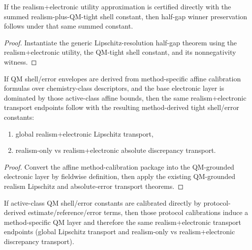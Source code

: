 \begin{theorem}\label{thm:qm-grounded-electronic-halfgap-transport}
If the realism+electronic utility approximation is certified directly with the summed realism-plus-QM-tight shell constant, then half-gap winner preservation follows under that same summed constant.
\end{theorem}

\begin{proof}
Instantiate the generic Lipschitz-resolution half-gap theorem using the realism+electronic utility, the QM-tight shell constant, and its nonnegativity witness.
\end{proof}

\begin{theorem}\label{thm:qm-method-specific-electronic-transport}
If QM shell/error envelopes are derived from method-specific affine calibration formulas over chemistry-class descriptors, and the base electronic layer is dominated by those active-class affine bounds, then the same realism+electronic transport endpoints follow with the resulting method-derived tight shell/error constants:
\begin{enumerate}
\item global realism+electronic Lipschitz transport,
\item realism-only vs realism+electronic absolute discrepancy transport.
\end{enumerate}
\end{theorem}

\begin{proof}
Convert the affine method-calibration package into the QM-grounded electronic layer by fieldwise definition, then apply the existing QM-grounded realism Lipschitz and absolute-error transport theorems.
\end{proof}

\begin{theorem}\label{thm:qm-protocol-derived-method-calibration-transport}
If active-class QM shell/error constants are calibrated directly by protocol-derived estimate/reference/error terms, then those protocol calibrations induce a method-specific QM layer and therefore the same realism+electronic transport endpoints (global Lipschitz transport and realism-only vs realism+electronic discrepancy transport).
\end{theorem}

